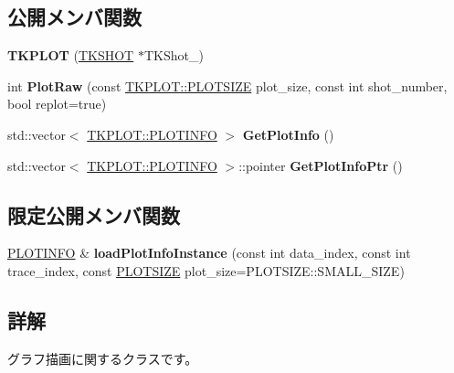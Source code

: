 \subsection*{公開メンバ関数}
\begin{DoxyCompactItemize}
\item 
\mbox{\label{class_t_k_p_l_o_t_aeb9168bcf7e45c45fc38dab63e6b90b3}} 
{\bfseries T\+K\+P\+L\+OT} (\hyperlink{class_t_k_s_h_o_t}{T\+K\+S\+H\+OT} $\ast$T\+K\+Shot\+\_\+)
\item 
\mbox{\label{class_t_k_p_l_o_t_a0dcffb0672762042e8dca5791b97e182}} 
int {\bfseries Plot\+Raw} (const \hyperlink{class_t_k_p_l_o_t_a158082ae168750554cf23edde9a27416}{T\+K\+P\+L\+O\+T\+::\+P\+L\+O\+T\+S\+I\+ZE} plot\+\_\+size, const int shot\+\_\+number, bool replot=true)
\item 
\mbox{\label{class_t_k_p_l_o_t_a5ddc4ef2a68d8649cfb2aebf507121fd}} 
std\+::vector$<$ \hyperlink{class_t_k_p_l_o_t_1_1_p_l_o_t_i_n_f_o}{T\+K\+P\+L\+O\+T\+::\+P\+L\+O\+T\+I\+N\+FO} $>$ {\bfseries Get\+Plot\+Info} ()
\item 
\mbox{\label{class_t_k_p_l_o_t_a4087cc1a73e760ac8eb32cbdf78a4433}} 
std\+::vector$<$ \hyperlink{class_t_k_p_l_o_t_1_1_p_l_o_t_i_n_f_o}{T\+K\+P\+L\+O\+T\+::\+P\+L\+O\+T\+I\+N\+FO} $>$\+::pointer {\bfseries Get\+Plot\+Info\+Ptr} ()
\end{DoxyCompactItemize}
\subsection*{限定公開メンバ関数}
\begin{DoxyCompactItemize}
\item 
\mbox{\label{class_t_k_p_l_o_t_aae92c92917093101c52d08d132aee75b}} 
\hyperlink{class_t_k_p_l_o_t_1_1_p_l_o_t_i_n_f_o}{P\+L\+O\+T\+I\+N\+FO} \& {\bfseries load\+Plot\+Info\+Instance} (const int data\+\_\+index, const int trace\+\_\+index, const \hyperlink{class_t_k_p_l_o_t_a158082ae168750554cf23edde9a27416}{P\+L\+O\+T\+S\+I\+ZE} plot\+\_\+size=P\+L\+O\+T\+S\+I\+Z\+E\+::\+S\+M\+A\+L\+L\+\_\+\+S\+I\+ZE)
\end{DoxyCompactItemize}


\subsection{詳解}
グラフ描画に関するクラスです。 


